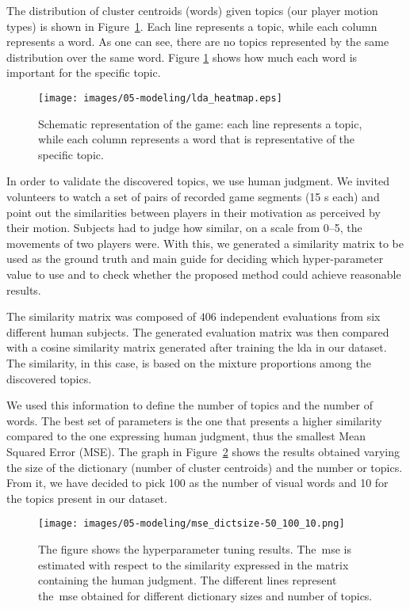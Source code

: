 The distribution of cluster centroids (words) given topics (our player motion types) is shown in Figure~\ref{fig:overall_game}.
Each line represents a topic, while each column represents a word. As one can see, there are no topics represented by the same distribution over the same word. Figure \ref{fig:overall_game} shows how much each word is important for the specific topic.

\begin{figure}[h]
	\centering
	\texttt{[image: images/05-modeling/lda\_heatmap.eps]}
	\caption{Schematic representation of the game: each line represents a topic, while each column represents a word that is representative of the specific topic.}
  \label{fig:overall_game}
\end{figure}

In order to validate the discovered topics, we use human judgment. We invited volunteers to watch a set of pairs of recorded game segments (15 s each) and point out the similarities between players in their motivation as perceived by their motion. Subjects had to judge how similar, on a scale from 0--5, the movements of two players were. With this, we generated a similarity matrix to be used as the ground truth and main guide for deciding which hyper-parameter value to use and to check whether the proposed method could achieve reasonable results.

The similarity matrix was composed of $406$ independent evaluations from six different human subjects. The generated evaluation matrix was then compared with a cosine similarity matrix generated after training the \gls{lda} in our dataset. The similarity, in this case, is based on the mixture proportions among the discovered topics. 

We used this information to define the number of topics and the number of words. The best set of parameters is the one that presents a higher similarity compared to the one expressing human judgment, thus the smallest Mean Squared Error (MSE). The graph in Figure~\ref{hyperparameter_results} shows the results obtained varying the size of the dictionary (number of cluster centroids) and the number or topics. From it, we have decided to pick 100 as the number of visual words and 10 for the topics present in our dataset.

\begin{figure}[h]
	\centering
	\texttt{[image: images/05-modeling/mse\_dictsize-50\_100\_10.png]}
	\caption{The figure shows the hyperparameter tuning results. The~\gls{mse} is estimated with respect to the similarity expressed in the matrix containing the human judgment. The different lines represent the~\gls{mse} obtained for different dictionary sizes and number of topics.}
  \label{hyperparameter_results}
\end{figure}

